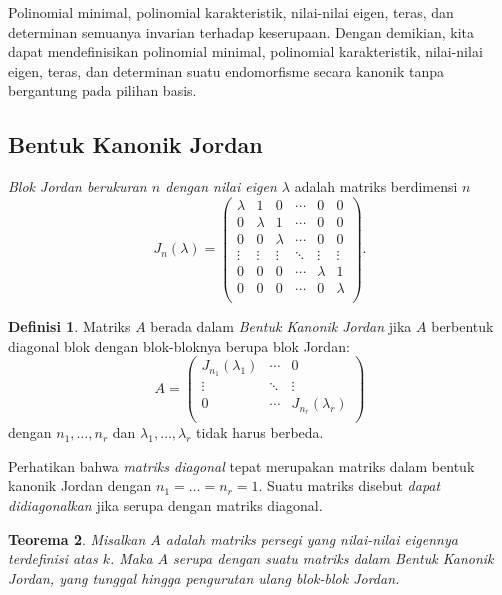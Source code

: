 \documentclass[12pt]{article}
\theoremstyle{plain}
\newtheorem{theorem}{Teorema}[section]
\theoremstyle{definition}
\newtheorem{definition}[theorem]{Definisi}
\theoremstyle{remark}
\numberwithin{equation}{section}
\begin{document}
Polinomial minimal, polinomial karakteristik, nilai-nilai eigen,
teras, dan determinan semuanya invarian terhadap keserupaan.
Dengan demikian, kita dapat mendefinisikan polinomial minimal,
polinomial karakteristik, nilai-nilai eigen, teras, dan determinan suatu
endomorfisme secara kanonik tanpa bergantung pada pilihan
basis.

\subsection{Bentuk Kanonik Jordan}

\emph{Blok Jordan berukuran $n$ dengan nilai eigen $\lambda$} adalah
matriks berdimensi $n$
\[
J_n(\lambda) = \begin{pmatrix}
\lambda & 1 & 0 & \cdots & 0 & 0\\
0 & \lambda & 1 & \cdots & 0 & 0\\
0 & 0& \lambda & \cdots & 0 & 0\\
\vdots & \vdots & \vdots & \ddots & \vdots & \vdots \\
0 & 0 & 0 & \cdots & \lambda & 1\\
0 & 0 & 0 & \cdots & 0 & \lambda\\
 \end{pmatrix} .
\]

\begin{definition}
Matriks $A$ berada dalam \emph{Bentuk Kanonik Jordan} jika $A$ berbentuk
diagonal blok dengan blok-bloknya berupa blok Jordan:
\[
A = \begin{pmatrix}
J_{n_1}(\lambda_1) & \cdots & 0\\
\vdots & \ddots & \vdots\\
0 & \cdots & J_{n_r}(\lambda_r)\\
\end{pmatrix} 
\]
dengan $n_1,\ldots,n_r$ dan $\lambda_1,\ldots,\lambda_r$
tidak harus berbeda.
\end{definition}

Perhatikan bahwa \emph{matriks diagonal} tepat merupakan matriks dalam bentuk
kanonik Jordan dengan $n_1=\ldots=n_r=1$.
Suatu matriks disebut \emph{dapat didiagonalkan} jika serupa dengan matriks diagonal.

\begin{theorem}
Misalkan $A$ adalah matriks persegi yang nilai-nilai eigennya terdefinisi atas $k$.
Maka $A$ serupa dengan suatu matriks dalam Bentuk Kanonik Jordan,
yang tunggal hingga pengurutan ulang blok-blok Jordan.
\end{theorem}
\end{document}
